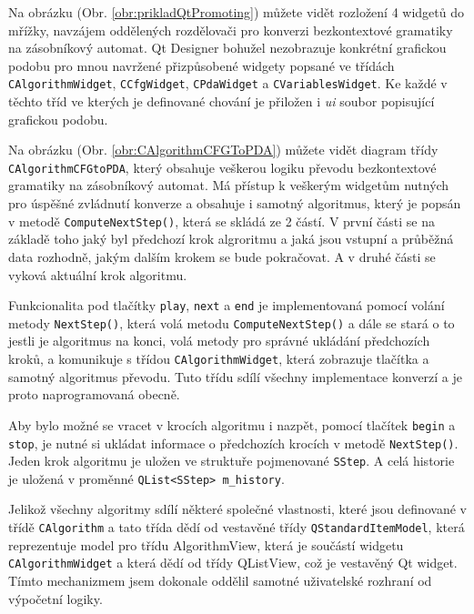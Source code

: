 
Na obrázku (Obr. \ref{obr:prikladQtPromoting}) můžete vidět rozložení 4 widgetů do mřížky, navzájem oddělených rozdělovači pro konverzi bezkontextové gramatiky na zásobníkový automat. Qt Designer bohužel nezobrazuje konkrétní grafickou podobu pro mnou navržené přizpůsobené widgety popsané ve třídách \texttt{CAlgorithmWidget}, \texttt{CCfgWidget}, \texttt{CPdaWidget} a \texttt{CVariablesWidget}. Ke každé v těchto tříd ve kterých je definované chování je přiložen i \textit{ui} soubor popisující grafickou podobu.


Na obrázku (Obr. \ref{obr:CAlgorithmCFGToPDA}) můžete vidět diagram třídy \texttt{CAlgorithmCFGtoPDA}, který obsahuje veškerou logiku převodu bezkontextové gramatiky na zásobníkový automat. Má přístup k veškerým widgetům nutných pro úspěšné zvládnutí konverze a obsahuje i samotný algoritmus, který je popsán v metodě \texttt{ComputeNextStep()}, která se skládá ze 2 částí. V první části se na základě toho jaký byl předchozí krok algroritmu a jaká jsou vstupní a průběžná data rozhodně, jakým dalším  krokem se bude pokračovat. A v druhé části se vyková aktuální krok algoritmu.

Funkcionalita pod tlačítky \texttt{play}, \texttt{next} a \texttt{end} je implementovaná pomocí volání metody \texttt{NextStep()}, která volá metodu \texttt{ComputeNextStep()} a dále se stará o to jestli je algoritmus na konci, volá metody pro správné ukládání předchozích kroků, a komunikuje s třídou \texttt{CAlgorithmWidget}, která zobrazuje tlačítka a samotný algoritmus převodu. Tuto třídu sdílí všechny implementace konverzí a je proto naprogramovaná obecně.

Aby bylo možné se vracet v krocích algoritmu i nazpět, pomocí tlačítek \texttt{begin} a \texttt{stop}, je nutné si ukládat informace o předchozích krocích v metodě \texttt{NextStep()}. Jeden krok algoritmu je uložen ve struktuře pojmenované \texttt{SStep}. A celá historie je uložená v proměnné \texttt{QList\textless{}SStep\textgreater{} m\_history}.

Jelikož všechny algoritmy sdílí některé společné vlastnosti, které jsou definované v třídě \texttt{CAlgorithm} a tato třída dědí od vestavěné třídy \texttt{QStandardItemModel}, která reprezentuje model pro třídu AlgorithmView, která je součástí widgetu \texttt{CAlgorithmWidget} a která dědí od třídy QListView, což je vestavěný Qt widget. Tímto mechanizmem jsem dokonale oddělil samotné uživatelské rozhraní od výpočetní logiky.

